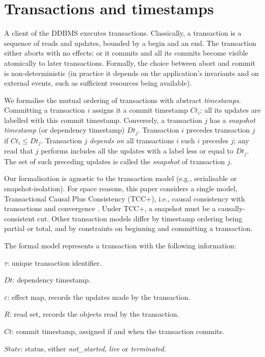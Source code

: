 \documentclass[systeme,french,english]{compas2022}
\begin{document}
\section{Transactions and timestamps}
\label{sec:transactions}

A client of the DDBMS executes transactions.
Classically, a transaction is a sequence of reads and updates, bounded by
a begin and an end.
The transaction either aborts with no effects; or it commits and all its
commits become visible atomically to later transactions.
Formally, the choice between abort and commit is non-deterministic (in
practice it depends on the application's invariants and on external
events, such as sufficient resources being available).

We formalise the mutual ordering of transactions with abstract
\emph{timestamps}.
Committing a transaction $i$ assigns it a commit timestamp
$\mathit{Ct}_{i}$; all its updates are labelled with this commit
timestamp.
Conversely, a transaction $j$  has a \emph{snapshot timestamp} (or dependency
timestamp) $\mathit{Dt}_{j}$.
Transaction $i$ precedes transaction $j$ if $\mathit{Ct}_{i} \le
\mathit{Dt}_{j}$.
Transaction $j$ \emph{depends on} all transactions $i$ such $i$ precedes
$j$; any read that $j$ performs includes all the updates with a label
less or equal to $\mathit{Dt}_{j}$.
The set of such preceding updates is called the \emph{snapshot} of
transaction $j$.
 
Our formalisation is agnostic to the transaction model (e.g.,
serialisable or snapshot-isolation).
For space reasons, this paper considers a single model, Transactional
Causal Plus Consistency (TCC+), i.e., causal consistency with
transactions and convergence \cite{rep:syn:sh228,rep:pro:sh182}.
Under TCC+, a snapshot must be a causally-consistent cut.
Other transaction models differ by timestamp ordering being partial or
total, and by constraints on beginning and committing a transaction.

The formal model represents a transaction with the following information:
\begin{compactitem}
\item $\tau$: unique transaction identifier.
\item $\mathit{Dt}$: dependency timestamp.
\item {$\varepsilon$}: effect map, records the updates made by the transaction.
\item ${R}$: read set, records the objects read by the transaction.
\item $\mathit{Ct}$: commit timestamp, assigned if and when the
  transaction commits.
\item $\mathit{State}$: status, either \emph{not\_started}, \emph{live} or \emph{terminated}.\\
\end{compactitem}
\end{document}
